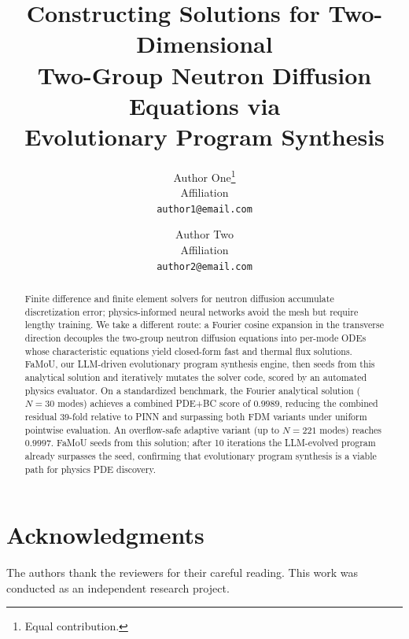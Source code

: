 \documentclass{article}
\title{Constructing Solutions for Two-Dimensional\\
Two-Group Neutron Diffusion Equations via\\
Evolutionary Program Synthesis}
\author{
  Author One\thanks{Equal contribution.} \\
  Affiliation \\
  \texttt{author1@email.com} \\
  \and
  Author Two\footnotemark[1] \\
  Affiliation \\
  \texttt{author2@email.com} \\
}
\date{}
\begin{document}
\maketitle

\begin{abstract}
Finite difference and finite element solvers for neutron diffusion accumulate discretization error; physics-informed neural networks avoid the mesh but require lengthy training.
%
We take a different route: a Fourier cosine expansion in the transverse direction decouples the two-group neutron diffusion equations into per-mode ODEs whose characteristic equations yield closed-form fast and thermal flux solutions.
%
FaMoU, our LLM-driven evolutionary program synthesis engine, then seeds from this analytical solution and iteratively mutates the solver code, scored by an automated physics evaluator.
%
On a standardized benchmark, the Fourier analytical solution ($N{=}30$ modes) achieves a combined PDE+BC score of $0.9989$, reducing the combined residual 39-fold relative to PINN and surpassing both FDM variants under uniform pointwise evaluation.
An overflow-safe adaptive variant (up to $N{=}221$ modes) reaches $0.9997$.
FaMoU seeds from this solution; after 10 iterations the LLM-evolved program already surpasses the seed, confirming that evolutionary program synthesis is a viable path for physics PDE discovery.
\end{abstract}








\section*{Acknowledgments}
The authors thank the reviewers for their careful reading. This work was conducted as an independent research project.




% 
\end{document}
